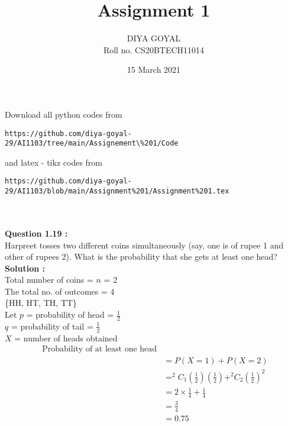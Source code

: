 \documentclass[journal,12pt,twocolumn]{IEEEtran}
\title{Assignment 1}
\author{DIYA GOYAL\\
Roll no. CS20BTECH11014}
\date{15 March 2021}
\begin{document}
\maketitle
\large Download all python codes from\\
\begin{lstlisting}
https://github.com/diya-goyal-29/AI1103/tree/main/Assignement\%201/Code
\end{lstlisting}


\large and latex - tikz codes from \\
\begin{lstlisting}
https://github.com/diya-goyal-29/AI1103/blob/main/Assignment%201/Assignment%201.tex
\end{lstlisting}
\\ \\
\large\textbf{Question 1.19 :} \\
Harpreet tosses two different coins simultaneously (say, one is of rupee 1 and other of rupees 2). What is the probability that she gets at least one head? \\
\large\textbf{Solution :}\\
Total number of coins = $n$ = 2\\
The total no. of outcomes = 4\\ 
\{HH, HT, TH, TT\}\\
Let $p$ = probability of head = $\frac{1}{2}$\\
$q$ = probability of tail = $\frac{1}{2}$\\
$X$ = number of heads obtained\\
\begin{equation*}
    \begin{split}
   \text{ Probability of at least one head}\\
        & = P(X = 1) + P(X = 2) \\
        & = ^2 C _1 (\frac{1}{2})(\frac{1}{2}) + ^2 C _2 (\frac{1}{2})^2\\ 
        & = 2 \times \frac{1}{4} + \frac{1}{4}\\
        & = \frac{3}{4}\\
        & = 0.75\\
    \end{split}
\end{equation*}
\end{document}
